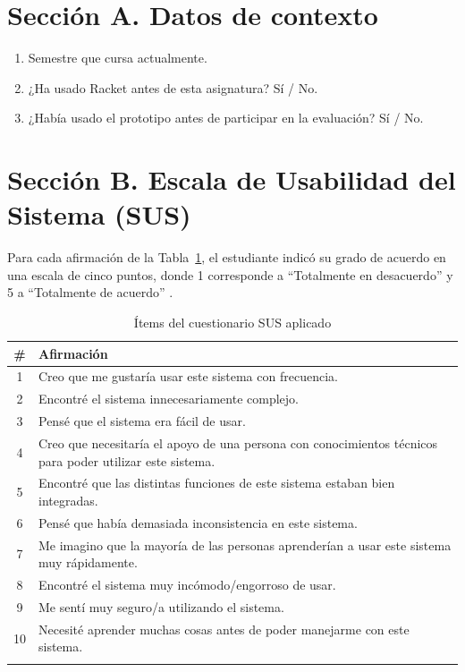 \section{Sección A. Datos de contexto}

\begin{enumerate}[leftmargin=*,topsep=2pt,itemsep=1pt,parsep=0pt]
    \item Semestre que cursa actualmente.
    \item ¿Ha usado Racket antes de esta asignatura? Sí / No.
    \item ¿Había usado el prototipo antes de participar en la evaluación? Sí / No.
\end{enumerate}

\section{Sección B. Escala de Usabilidad del Sistema (SUS)}

Para cada afirmación de la Tabla~\ref{tab:sus-items}, el estudiante indicó su grado de acuerdo en una escala de cinco puntos, donde 1 corresponde a ``Totalmente en desacuerdo'' y 5 a ``Totalmente de acuerdo'' \cite{brooke1996sus}.

\begin{longtable}{|c|p{12cm}|}
\hline
\textbf{\#} & \textbf{Afirmación} \\
\hline
1 & Creo que me gustaría usar este sistema con frecuencia. \\
\hline
2 & Encontré el sistema innecesariamente complejo. \\
\hline
3 & Pensé que el sistema era fácil de usar. \\
\hline
4 & Creo que necesitaría el apoyo de una persona con conocimientos técnicos para poder utilizar este sistema. \\
\hline
5 & Encontré que las distintas funciones de este sistema estaban bien integradas. \\
\hline
6 & Pensé que había demasiada inconsistencia en este sistema. \\
\hline
7 & Me imagino que la mayoría de las personas aprenderían a usar este sistema muy rápidamente. \\
\hline
8 & Encontré el sistema muy incómodo/engorroso de usar. \\
\hline
9 & Me sentí muy seguro/a utilizando el sistema. \\
\hline
10 & Necesité aprender muchas cosas antes de poder manejarme con este sistema. \\
\hline
\caption{Ítems del cuestionario SUS aplicado}
\label{tab:sus-items}
\end{longtable}

